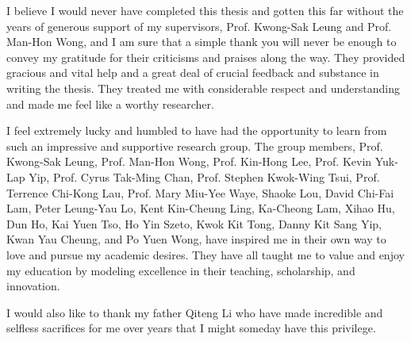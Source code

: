 I believe I would never have completed this thesis and gotten this far without the years of generous support of my supervisors, Prof. Kwong-Sak Leung and Prof. Man-Hon Wong, and I am sure that a simple thank you will never be enough to convey my gratitude for their criticisms and praises along the way. They provided gracious and vital help and a great deal of crucial feedback and substance in writing the thesis. They treated me with considerable respect and understanding and made me feel like a worthy researcher.

I feel extremely lucky and humbled to have had the opportunity to learn from such an impressive and supportive research group. The group members, Prof. Kwong-Sak Leung, Prof. Man-Hon Wong, Prof. Kin-Hong Lee, Prof. Kevin Yuk-Lap Yip, Prof. Cyrus Tak-Ming Chan, Prof. Stephen Kwok-Wing Tsui, Prof. Terrence Chi-Kong Lau, Prof. Mary Miu-Yee Waye, Shaoke Lou, David Chi-Fai Lam, Peter Leung-Yau Lo, Kent Kin-Cheung Ling, Ka-Cheong Lam, Xihao Hu, Dun Ho, Kai Yuen Tso, Ho Yin Szeto, Kwok Kit Tong, Danny Kit Sang Yip, Kwan Yau Cheung, and Po Yuen Wong, have inspired me in their own way to love and pursue my academic desires. They have all taught me to value and enjoy my education by modeling excellence in their teaching, scholarship, and innovation.

I would also like to thank my father Qiteng Li who have made incredible and selfless sacrifices for me over years that I might someday have this privilege.

